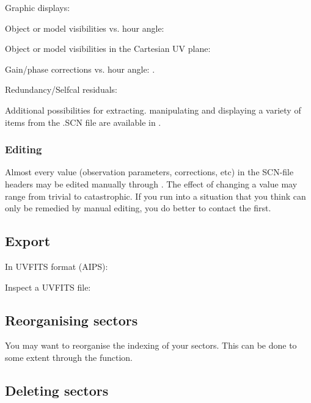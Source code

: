 \noindent Graphic displays: 
\bi 
\item   Object or model visibilities vs. hour angle:  
\item   Object or model visibilities in the Cartesian UV plane: 
\item   Gain/phase corrections vs. hour angle: . 
\item   Redundancy/Selfcal residuals:  
\ei 

        Additional possibilities for extracting. manipulating and displaying a
variety of items from the .SCN file are available in 
. 


\subsubsection{ Editing } 
\label{.edit} 

        Almost every value (observation parameters, corrections, etc) in the
SCN-file headers may be edited manually through . The effect of changing a value may range from trivial to
catastrophic. If you run into a situation that you think can only be remedied
by manual editing, you do better to contact the  first. 


\subsection{ Export } 
\label{.export} 

\bi 
\item   In UVFITS format (AIPS):  
\item   Inspect a UVFITS file:  
\ei 


\subsection{ Reorganising sectors } 
\label{.reorganise} 

        You may want to reorganise the indexing of your sectors. This can be
done to some extent through the  function. 


\subsection{ Deleting sectors } 
\label{.delete} 

